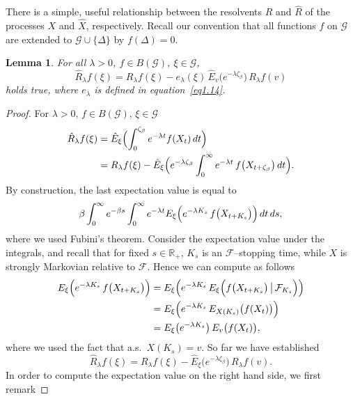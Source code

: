 \documentclass[11pt,a4paper]{amsart}
\newcommand{\gb}{\beta}
\newcommand{\gl}{\lambda}
\newcommand{\gD}{\Delta}
\newcommand{\cF}{\mathcal{F}}
\newcommand{\cG}{\mathcal{G}}
\newcommand{\1}{1}
\newcommand{\R}{\mathbb{R}}
\newtheorem{lemma}[theorem]{Lemma}
\theoremstyle{remark}
\newcommand{\cond}{\ensuremath\,\big|\,}
\newcommand{\hE}{\ensuremath{\hat E}}
\newcommand{\hR}{\ensuremath{\hat R}}
\newcommand{\hX}{\ensuremath{\hat X}}
\numberwithin{equation}{section}
\begin{document}
There is a simple, useful relationship between the resolvents $R$ and $\hR$ of the
processes $X$ and $\hX$, respectively. Recall our convention that all functions $f$
on $\cG$ are extended to $\cG\cup\{\gD\}$ by $f(\gD)=0$.

\begin{lemma}   \label{lem1.6}
For all $\gl>0$, $f\in B(\cG)$, $\xi\in\cG$,
\begin{equation}    \label{eq1.30}
    \hR_\gl f(\xi)
        = R_\gl f(\xi) - e_\gl(\xi)\,\hE_v\bigl(e^{-\gl \zeta_\gb}\bigr)\,R_\gl f(v)
\end{equation}
holds true, where $e_\gl$ is defined in equation~\eqref{eq1.14}.
\end{lemma}

\begin{proof}
For $\gl>0$, $f\in B(\cG)$, $\xi\in\cG$
\begin{align*}
    \hR_\gl f(\xi)
        &= \hE_\xi\Bigl(\int_0^{\zeta_\gb} e^{-\gl t} f(X_t)\,dt\Bigr)\\
        &= R_\gl f(\xi) - \hE_\xi\Bigl(e^{-\gl\zeta_\gb} \int_0^\infty
                e^{-\gl t}\,f\bigl(X_{t+\zeta_\gb}\bigr)\,dt\Bigr).
\end{align*}
By construction, the last expectation value is equal to
\begin{equation*}
    \gb\int_0^\infty e^{-\gb s}\int_0^\infty e^{-\gl t}
        E_\xi\Bigl(e^{-\gl K_s}\,f\bigl(X_{t+K_s}\bigr)\Bigr)\,dt\,ds,
\end{equation*}
where we used Fubini's theorem. Consider the expectation value under the integrals,
and recall that for fixed $s\in\R_+$, $K_s$ is an $\cF$--stopping time, while
$X$ is strongly Markovian relative to $\cF$. Hence we can compute as follows
\begin{align*}
    E_\xi\Bigl(e^{-\gl K_s}\,f\bigl(X_{t+K_s}\bigr)\Bigr)
        &= E_\xi\Bigl(e^{-\gl K_s}\,E_\xi\Bigl(f\bigl(X_{t+K_s}\bigr)\cond \cF_{K_s}\Bigr)\Bigr)\\
        &= E_\xi\Bigl(e^{-\gl K_s}\,E_{X(K_s)}\bigl(f(X_t)\bigr)\Bigr)\\
        &= E_\xi\bigl(e^{-\gl K_s}\bigr)\,E_v\bigl(f(X_t)\bigr),
\end{align*}
where we used the fact that a.s.\ $X(K_s)=v$. So far we have established
\begin{equation*}
    \hR_\gl f(\xi) = R_\gl f(\xi) - \hE_\xi\bigl(e^{-\gl \zeta_\gb}\bigr)\,R_\gl f(v).
\end{equation*}
In order to compute the expectation value on the right hand side, we first remark

\end{proof}
\end{document}
